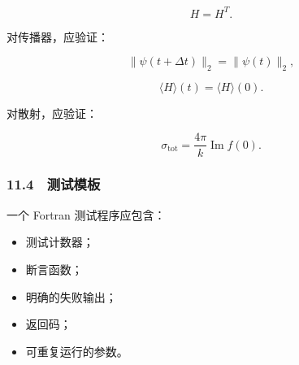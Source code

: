 \documentclass[
]{ctexbook}
\providecommand{\tightlist}{%
  \setlength{\itemsep}{0pt}\setlength{\parskip}{0pt}}
\begin{document}
\[
H=H^T.
\]

对传播器，应验证：

\[
\|\psi(t+\Delta t)\|_2=\|\psi(t)\|_2,
\]

\[
\langle H\rangle(t)=\langle H\rangle(0).
\]

对散射，应验证：

\[
\sigma_{\mathrm{tot}}=\frac{4\pi}{k}\operatorname{Im}f(0).
\]

\hypertarget{ux6d4bux8bd5ux6a21ux677f}{%
\subsubsection{11.4　测试模板}\label{ux6d4bux8bd5ux6a21ux677f}}

一个 Fortran 测试程序应包含：

\begin{itemize}
\tightlist
\item
  测试计数器；
\item
  断言函数；
\item
  明确的失败输出；
\item
  返回码；
\item
  可重复运行的参数。
\end{itemize}
\end{document}
